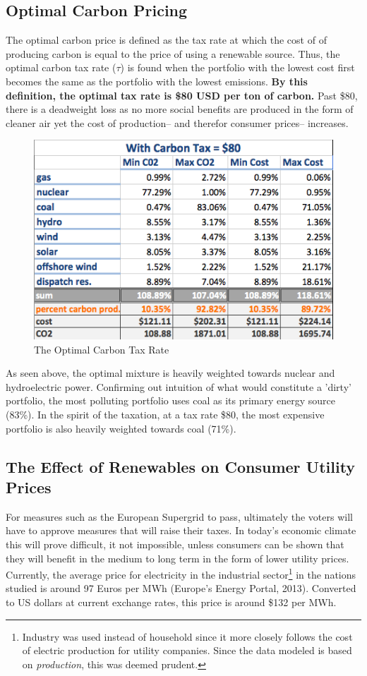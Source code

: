 \documentclass{article}
\begin{document}
\subsection{Optimal Carbon Pricing}
The optimal carbon price is defined as the tax rate at which the cost of of producing carbon is equal to the price of using a renewable source. Thus, the optimal carbon tax rate ($\tau$) is found when the portfolio with the lowest cost first becomes the same as the portfolio with the lowest emissions. {\bf By this definition, the optimal tax rate is \$80 USD per ton of carbon.} Past \$80, there is a deadweight loss as no more social benefits are produced in the form of cleaner air yet the cost of production-- and therefor consumer prices-- increases. 

\begin{figure}[H]
	\begin{center}
	\includegraphics[scale = .6]{Figures/opttax.png}
	\caption{The Optimal Carbon Tax Rate}
	\end{center}
\end{figure}

As seen above, the optimal mixture is heavily weighted towards nuclear and hydroelectric power. Confirming out intuition of what would constitute a 'dirty' portfolio, the most polluting portfolio uses coal as its primary energy source (83\%). In the spirit of the taxation, at a tax rate \$80, the most expensive portfolio is also heavily weighted towards coal (71\%).


\subsection{The Effect of Renewables on Consumer Utility Prices}
For measures such as the European Supergrid to pass, ultimately the voters will have to approve measures that will raise their taxes. In today's economic climate this will prove difficult, it not impossible, unless consumers can be shown that they will benefit in the medium to long term in the form of lower utility prices. Currently, the average price for electricity in the industrial sector\footnote{Industry was used instead of household since it more closely follows the cost of electric production for utility companies. Since the data modeled is based on \emph{production}, this was deemed prudent.} in the nations studied is around 97 Euros per MWh (Europe's Energy Portal, 2013). Converted to US dollars at current exchange rates, this price is around \$132 per MWh. \*
\end{document}
